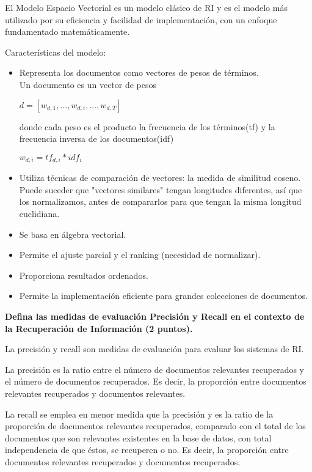 \documentclass[11pt]{exam}
\begin{document}
\begin{questions}
El Modelo Espacio Vectorial es un modelo clásico de RI y es el modelo más utilizado por su eficiencia y facilidad de implementación, con un enfoque fundamentado matemáticamente.

Características del modelo:

\begin{itemize}
	\item Representa los documentos como vectores de pesos de términos. \\
	Un documento es un vector de pesos \\
	\begin{center}
		$d = [w_{d,1}, ..., w_{d,i}, ..., w_{d,T}]$
	\end{center}
	donde cada peso es el producto la frecuencia de los términos(tf) y la frecuencia inversa de los documentos(idf)
		\begin{center}
		$w_{d,i} = tf_{d,i} * idf_{i}$
	\end{center}
	\item Utiliza técnicas de comparación de vectores: la medida de similitud coseno. \\
	Puede suceder que "vectores similares" tengan longitudes diferentes, así que los normalizamos, antes de compararlos para que tengan la misma longitud euclidiana.
	\item Se basa en álgebra vectorial.
	\item Permite el ajuste parcial y el ranking (necesidad de normalizar).
	\item Proporciona resultados ordenados.
	\item Permite la implementación eficiente para grandes colecciones de documentos.
\end{itemize}

{\bf \question Defina las medidas de evaluación Precisión y Recall en el contexto de la Recuperación de Información (2 puntos).}

La precisión y recall son medidas de evaluación para evaluar los sistemas de RI.

La precisión es la ratio entre el número de documentos relevantes recuperados y el número de documentos recuperados. Es decir, la proporción entre documentos relevantes recuperados y documentos relevantes.

La recall se emplea en menor medida que la precisión y es la ratio de la proporción de documentos relevantes recuperados, comparado con el total de los documentos que son relevantes existentes en la base de datos, con total independencia de que éstos, se recuperen o no. Es decir, la proporción entre documentos relevantes recuperados y documentos recuperados.


\end{questions}
\end{document}
